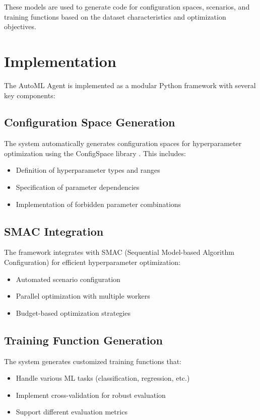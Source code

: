 \documentclass[11pt]{article}
\begin{document}
These models are used to generate code for configuration spaces, scenarios, and training functions based on the dataset characteristics and optimization objectives.

\section{Implementation}
The AutoML Agent is implemented as a modular Python framework with several key components:

\subsection{Configuration Space Generation}
The system automatically generates configuration spaces for hyperparameter optimization using the ConfigSpace library \citep{configspace}. This includes:
\begin{itemize}
    \item Definition of hyperparameter types and ranges
    \item Specification of parameter dependencies
    \item Implementation of forbidden parameter combinations
\end{itemize}

\subsection{SMAC Integration}
The framework integrates with SMAC (Sequential Model-based Algorithm Configuration) \citep{smac3} for efficient hyperparameter optimization:
\begin{itemize}
    \item Automated scenario configuration
    \item Parallel optimization with multiple workers
    \item Budget-based optimization strategies
\end{itemize}

\subsection{Training Function Generation}
The system generates customized training functions that:
\begin{itemize}
    \item Handle various ML tasks (classification, regression, etc.)
    \item Implement cross-validation for robust evaluation
    \item Support different evaluation metrics
\end{itemize}
\end{document}
